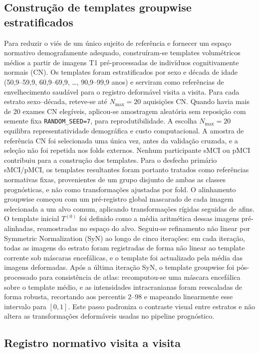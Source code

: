 \documentclass[review]{elsarticle}
\newcommand{\code}[1]{\texttt{#1}}
\begin{document}
	\subsection{Construção de templates groupwise estratificados}
\label{sec:groupwise}
	Para reduzir o viés de um único sujeito de referência \cite{reuter-2012} e fornecer um espaço normativo demografamente adequado, construíram-se templates volumétricos médios a partir de imagens T1 pré-processadas de indivíduos cognitivamente normais (CN). Os templates foram estratificados por sexo e década de idade (50{,}9--59{,}9, 60{,}9--69{,}9, \ldots, 90{,}9--99{,}9 anos) e serviram como referências de envelhecimento saudável para o registro deformável visita a visita.
	Para cada estrato sexo--década, reteve-se até $N_{\max}=20$ aquisições CN. Quando havia mais de 20 exames CN elegíveis, aplicou-se amostragem aleatória sem reposição com semente fixa \code{RANDOM\_SEED=7}, para reprodutibilidade. A escolha $N_{\max}=20$ equilibra representatividade demográfica e custo computacional.
	A amostra de referência CN foi selecionada uma única vez, antes da validação cruzada, e a seleção não foi repetida nos folds externos. Nenhum participante sMCI ou pMCI contribuiu para a construção dos templates. Para o desfecho primário sMCI/pMCI, os templates resultantes foram portanto tratados como referências normativas fixas, provenientes de um grupo disjunto de ambas as classes prognósticas, e não como transformações ajustadas por fold.
	O alinhamento groupwise começou com um pré-registro global mascarado de cada imagem selecionada a um alvo comum, aplicando transformações rígidas seguidas de afins. O template inicial $T^{(0)}$ foi definido como a média aritmética dessas imagens pré-alinhadas, reamostradas no espaço do alvo. Seguiu-se refinamento não linear por Symmetric Normalization (SyN) \cite{avants-2014} ao longo de cinco iterações: em cada iteração, todas as imagens do estrato foram registradas de forma não linear ao template corrente sob máscaras encefálicas, e o template foi actualizado pela média das imagens deformadas. Após a última iteração SyN, o template groupwise foi pós-processado para consistência de atlas: recomputou-se uma máscara encefálica sobre o template médio, e as intensidades intracranianas foram reescaladas de forma robusta, recortando aos percentis 2--98 e mapeando linearmente esse intervalo para $[0,1]$. Este passo padroniza o contraste visual entre estratos e não altera as transformações deformáveis usadas no pipeline prognóstico.

	\subsection{Registro normativo visita a visita}\label{subsec:deslocamento_longitudinal}
\end{document}

